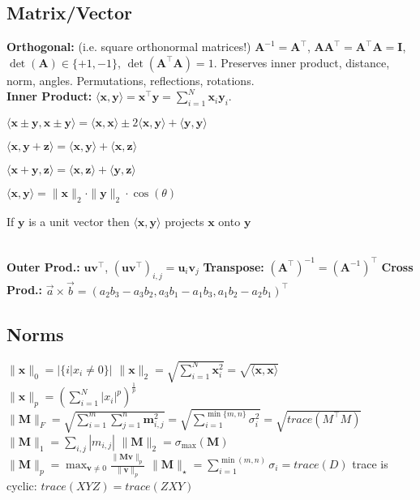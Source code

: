 \subsection*{Matrix/Vector}
\textbf{Orthogonal:} (i.e. square orthonormal matrices!) $\mathbf{A}^{-1} = \mathbf{A}^\top$, $\mathbf{A} \mathbf{A}^\top = \mathbf{A}^\top \mathbf{A} = \mathbf{I}$, $\operatorname{det}(\mathbf{A}) \in \{+1, -1\}$, $\operatorname{det}(\mathbf{A}^\top \mathbf{A}) = 1$. Preserves inner product, distance, norm, angles. Permutations, reflections, rotations.\\
\textbf{Inner Product:} $\langle \mathbf{x}, \mathbf{y} \rangle = \mathbf{x}^\top \mathbf{y} = \sum_{i=1}^{N} \mathbf{x}_i \mathbf{y}_i$.
\begin{inparaitem}[\color{red}\textopenbullet]
		\item $\langle \mathbf{x} \pm \mathbf{y}, \mathbf{x} \pm \mathbf{y} \rangle = \langle \mathbf{x}, \mathbf{x} \rangle \pm 2 \langle \mathbf{x}, \mathbf{y} \rangle + \langle \mathbf{y}, \mathbf{y} \rangle$
		\item $\langle \mathbf{x}, \mathbf{y} + \mathbf{z} \rangle = \langle \mathbf{x}, \mathbf{y} \rangle + \langle \mathbf{x}, \mathbf{z} \rangle$
		\item $\langle \mathbf{x} + \mathbf{y}, \mathbf{z} \rangle = \langle \mathbf{x}, \mathbf{z} \rangle + \langle \mathbf{y}, \mathbf{z} \rangle$
		\item $\langle \mathbf{x}, \mathbf{y} \rangle = \|\mathbf{x}\|_2 \cdot \|\mathbf{y}\|_2 \cdot \cos(\theta)$
		\item If $\mathbf{y}$ is a unit vector then $\langle \mathbf{x}, \mathbf{y} \rangle$ projects $\mathbf{x}$ onto $\mathbf{y}$
	\end{inparaitem}\\
\textbf{Outer Prod.:} $\mathbf{u} \mathbf{v}^\top$, $(\mathbf{u} \mathbf{v}^\top)_{i, j} = \mathbf{u}_i \mathbf{v}_j$
\textbf{Transpose:} $(\mathbf{A}^\top)^{-1} = (\mathbf{A}^{-1})^\top$
\textbf{Cross Prod.:} $\vec{a}\times\vec{b}=(a_2b_3-a_3b_2, a_3b_1-a_1b_3, a_1b_2-a_2b_1)^\top$

\subsection*{Norms}
$\|\mathbf{x}\|_0 = |\{i | x_i \neq 0\}|$ \qquad $\|\mathbf{x}\|_2 = \sqrt{\sum_{i=1}^{N} \mathbf{x}_i^2} = \sqrt{\langle \mathbf{x}, \mathbf{x} \rangle}$\\
$\|\mathbf{x}\|_p = \left( \sum_{i=1}^{N} |x_i|^p \right)^{\frac{1}{p}}$\\
$\|\mathbf{M}\|_F =\allowbreak \sqrt{\sum_{i=1}^{m} \sum_{j=1}^{n}\mathbf{m}_{i,j}^2} =\allowbreak \sqrt{\sum_{i=1}^{\min\{m, n\}} \sigma_i^2} = \sqrt{trace(M^\top M)}$\\
$\|\mathbf{M}\|_1 = \sum_{i,j} | m_{i,j}|$ \qquad $\|\mathbf{M}\|_2 = \sigma_{\text{max}}(\mathbf{M})$\\
$\|\mathbf{M}\|_p = \max_{\mathbf{v} \neq 0} \frac{\|\mathbf{M}\mathbf{v}\|_p}{\|\mathbf{v}\|_p}$ \qquad $\|\mathbf{M}\|_\star = \sum_{i=1}^{\min(m, n)} \sigma_i = trace(D)$
trace is cyclic: $trace(XYZ) = trace(ZXY)$

